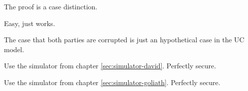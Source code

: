 %
%
\label{sec:proof}

The proof is a case distinction.



Easy, just works.




The case that both parties are corrupted is just an hypothetical case in the UC
model.



Use the simulator from chapter \ref{sec:simulator-david}. Perfectly secure.



Use the simulator from chapter \ref{sec:simulator-goliath}. Perfectly secure.

